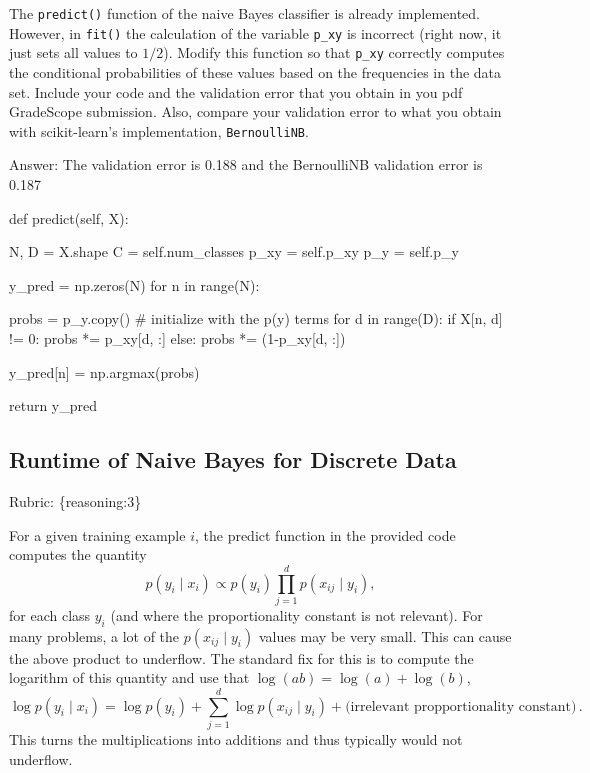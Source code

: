 \documentclass{article}
\def\rubric#1{\gre{Rubric: \{#1\}}}{}
\def\ans#1{\par\gre{Answer: #1}}
\def\blu#1{{\color{blu}#1}}
\def\gre#1{{\color{gre}#1}}
\def\cond{\; | \;}
\begin{document}
The \texttt{predict()} function of the naive Bayes classifier is already implemented.
However, in \texttt{fit()}
the calculation of the variable \texttt{p\_xy} is incorrect
(right now, it just sets all values to $1/2$).
\blu{Modify this function so that \texttt{p\_xy} correctly
computes the conditional probabilities of these values based on the
frequencies in the data set. Include your code and the validation error that you obtain in you pdf GradeScope submission.
Also, compare your validation error to what you obtain with scikit-learn's implementation, \texttt{BernoulliNB}.}
\ans{ The validation error is 0.188 and the BernoulliNB validation error is 0.187}
\begin{python}
	def predict(self, X):
	
	N, D = X.shape
	C = self.num_classes
	p_xy = self.p_xy
	p_y = self.p_y
	
	y_pred = np.zeros(N)
	for n in range(N):
	
	probs = p_y.copy() # initialize with the p(y) terms
	for d in range(D):
	if X[n, d] != 0:
	probs *= p_xy[d, :]
	else:
	probs *= (1-p_xy[d, :])
	
	y_pred[n] = np.argmax(probs)
	
	return y_pred
\end{python}

\subsection{Runtime of Naive Bayes for Discrete Data}
\rubric{reasoning:3}

For a given training example $i$, the predict function in the provided code computes the quantity
\[
p(y_i \cond x_i) \propto p(y_i)\prod_{j=1}^d p(x_{ij} \cond y_i),
\]
for each class $y_i$ (and where the proportionality constant is not relevant). For many problems, a lot of the $p(x_{ij} \cond y_i)$ values may be very small. This can cause the above product to underflow. The standard fix for this is to compute the logarithm of this quantity and use that $\log(ab) = \log(a)+\log(b)$,
\[
\log p(y_i \cond x_i) = \log p(y_i) + \sum_{j=1}^d \log p(x_{ij} \cond y_i) + \text{(irrelevant propportionality constant)} \, .
\]
This turns the multiplications into additions and thus typically would not underflow.
\end{document}
